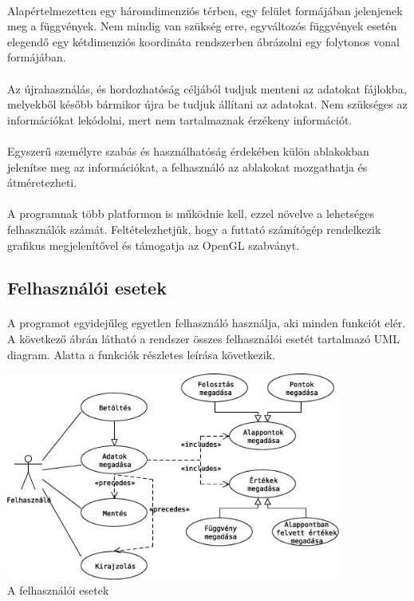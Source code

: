 \documentclass[12pt]{report}
\begin{document}
\paragraph{}
Alapértelmezetten egy háromdimenziós térben, egy felület formájában jelenjenek meg a függvények. Nem mindig van szükség erre, egyváltozós függvények esetén elegendő egy kétdimenziós koordináta rendszerben ábrázolni egy folytonos vonal formájában.
\paragraph{}
Az újrahasználás, és hordozhatóság céljából tudjuk menteni az adatokat fájlokba, melyekből később bármikor újra be tudjuk állítani az adatokat. Nem szükséges az információkat lekódolni, mert nem tartalmaznak érzékeny információt.
\paragraph{}
Egyszerű személyre szabás és használhatóság érdekében külön ablakokban jelenítse meg az információkat, a felhasználó az ablakokat mozgathatja és átméretezheti.
\paragraph{}
A programnak több platformon is működnie kell, ezzel növelve a lehetséges felhasználók számát. Feltételezhetjük, hogy a futtató számítógép rendelkezik grafikus megjelenítővel és támogatja az OpenGL szabványt.
\subsection{Felhasználói esetek}
\paragraph{}
A programot egyidejűleg egyetlen felhasználó használja, aki minden funkciót elér. A következő ábrán látható a rendszer összes felhasználói esetét tartalmazó UML diagram. Alatta a funkciók részletes leírása következik.
\begin{center}
\includegraphics[width=11cm]{pics/uml/use_case}\\
{\footnotesize A felhasználói esetek}
\end{center}
\end{document}
